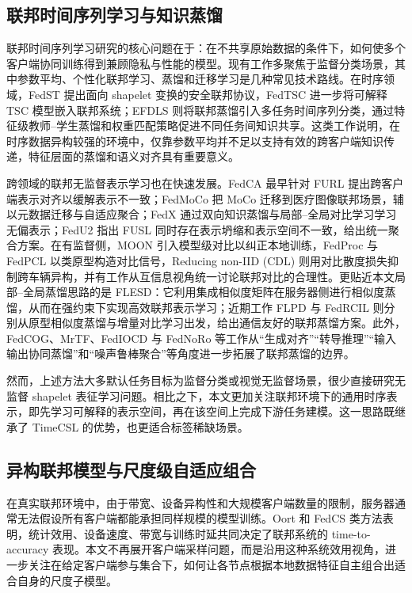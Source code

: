\documentclass{article}
\begin{document}
\subsection{联邦时间序列学习与知识蒸馏}

联邦时间序列学习研究的核心问题在于：在不共享原始数据的条件下，如何使多个客户端协同训练得到兼顾隐私与性能的模型\cite{fedavg}。现有工作多聚焦于监督分类场景，其中参数平均、个性化联邦学习、蒸馏和迁移学习是几种常见技术路线\cite{fedkdsurvey}。在时序领域，FedST 提出面向 shapelet 变换的安全联邦协议\cite{fedst}，FedTSC 进一步将可解释 TSC 模型嵌入联邦系统\cite{fedtsc}；EFDLS 则将联邦蒸馏引入多任务时间序列分类，通过特征级教师--学生蒸馏和权重匹配策略促进不同任务间知识共享\cite{efdls}。这类工作说明，在时序数据异构较强的环境中，仅靠参数平均并不足以支持有效的跨客户端知识传递，特征层面的蒸馏和语义对齐具有重要意义\cite{moon,fedx}。

跨领域的联邦无监督表示学习也在快速发展。FedCA 最早针对 FURL 提出跨客户端表示对齐以缓解表示不一致\cite{fedca}；FedMoCo 把 MoCo 迁移到医疗图像联邦场景，辅以元数据迁移与自适应聚合\cite{fedmoco}；FedX 通过双向知识蒸馏与局部--全局对比学习学习无偏表示\cite{fedx}；FedU2 指出 FUSL 同时存在表示坍缩和表示空间不一致，给出统一聚合方案\cite{fedu2}。在有监督侧，MOON 引入模型级对比以纠正本地训练\cite{moon}，FedProc 与 FedPCL 以类原型构造对比信号\cite{fedproc,fedpcl}，Reducing non-IID (CDL) 则用对比散度损失抑制跨车辆异构\cite{fedcdl}，并有工作从互信息视角统一讨论联邦对比的合理性\cite{fedmi}。更贴近本文局部--全局蒸馏思路的是 FLESD\cite{flesd}：它利用集成相似度矩阵在服务器侧进行相似度蒸馏，从而在强约束下实现高效联邦表示学习；近期工作 FLPD\cite{flpd} 与 FedRCIL\cite{fedrcil} 则分别从原型相似度蒸馏与增量对比学习出发，给出通信友好的联邦蒸馏方案。此外，FedCOG\cite{fedcog}、MrTF\cite{mrtf}、FedIOCD\cite{fediocd} 与 FedNoRo\cite{fednoro} 等工作从“生成对齐”“转导推理”“输入输出协同蒸馏”和“噪声鲁棒聚合”等角度进一步拓展了联邦蒸馏的边界。

然而，上述方法大多默认任务目标为监督分类或视觉无监督场景，很少直接研究无监督 shapelet 表征学习问题。相比之下，本文更加关注联邦环境下的通用时序表示，即先学习可解释的表示空间，再在该空间上完成下游任务建模。这一思路既继承了 TimeCSL 的优势\cite{timescsl}，也更适合标签稀缺场景\cite{fedsmall}。

\subsection{异构联邦模型与尺度级自适应组合}

在真实联邦环境中，由于带宽、设备异构性和大规模客户端数量的限制，服务器通常无法假设所有客户端都能承担同样规模的模型训练。Oort 和 FedCS 类方法表明，统计效用、设备速度、带宽与训练时延共同决定了联邦系统的 time-to-accuracy 表现\cite{oort,fedcsadaptive}。本文不再展开客户端采样问题，而是沿用这种系统效用视角，进一步关注在给定客户端参与集合下，如何让各节点根据本地数据特征自主组合出适合自身的尺度子模型。
\end{document}
